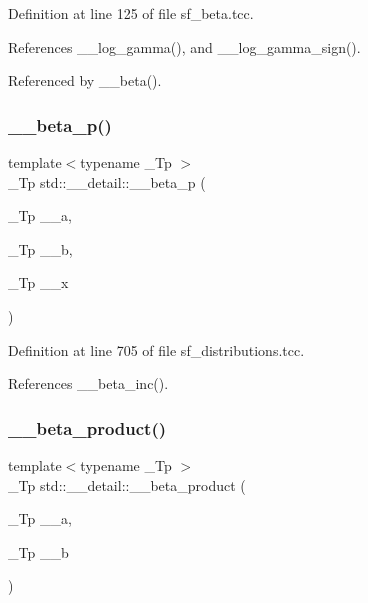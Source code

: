 Definition at line 125 of file sf\+\_\+beta.\+tcc.



References \+\_\+\+\_\+log\+\_\+gamma(), and \+\_\+\+\_\+log\+\_\+gamma\+\_\+sign().



Referenced by \+\_\+\+\_\+beta().

\mbox{\label{namespacestd_1_1____detail_ae1ebc99ce7ff6bf261b519ab293f4fd6}} 
\subsubsection{\texorpdfstring{\+\_\+\+\_\+beta\+\_\+p()}{\_\_beta\_p()}}
{\footnotesize\ttfamily template$<$typename \+\_\+\+Tp $>$ \\
\+\_\+\+Tp std\+::\+\_\+\+\_\+detail\+::\+\_\+\+\_\+beta\+\_\+p (\begin{DoxyParamCaption}\item[{\+\_\+\+Tp}]{\+\_\+\+\_\+a,  }\item[{\+\_\+\+Tp}]{\+\_\+\+\_\+b,  }\item[{\+\_\+\+Tp}]{\+\_\+\+\_\+x }\end{DoxyParamCaption})}



Definition at line 705 of file sf\+\_\+distributions.\+tcc.



References \+\_\+\+\_\+beta\+\_\+inc().

\mbox{\label{namespacestd_1_1____detail_a9baa688a27befab7fa48ccfb4a87a9ca}} 
\subsubsection{\texorpdfstring{\+\_\+\+\_\+beta\+\_\+product()}{\_\_beta\_product()}}
{\footnotesize\ttfamily template$<$typename \+\_\+\+Tp $>$ \\
\+\_\+\+Tp std\+::\+\_\+\+\_\+detail\+::\+\_\+\+\_\+beta\+\_\+product (\begin{DoxyParamCaption}\item[{\+\_\+\+Tp}]{\+\_\+\+\_\+a,  }\item[{\+\_\+\+Tp}]{\+\_\+\+\_\+b }\end{DoxyParamCaption})}



